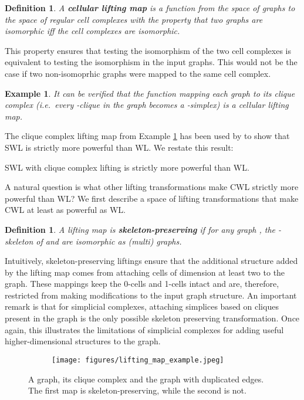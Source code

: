 \documentclass{article}
\newtheorem{definition}[theorem]{Definition}
\newtheorem{example}[theorem]{Example}
\begin{document}
\begin{definition}
A \textbf{cellular lifting map} is a function  from the space of graphs  to the space of regular cell complexes  with the property that two graphs  are isomorphic iff the cell complexes  are isomorphic.  
\end{definition}

This property ensures that testing the isomorphism of the two cell complexes is equivalent to testing the isomorphism in the input graphs. This would not be the case if two non-isomoprhic graphs were mapped to the same cell complex.

\begin{example}
\label{ex:clique_complex}
It can be verified that the function mapping each graph to its clique complex (i.e.\ every -clique in the graph becomes a -simplex) is a cellular lifting map. \end{example}

The clique complex lifting map from Example \ref{ex:clique_complex} has been used by \citet{bodnar2021weisfeiler} to show that SWL is strictly more powerful than WL. We restate this result:
\begin{theorem}
SWL with clique complex lifting is strictly more powerful than WL. 
\end{theorem}

A natural question is what other lifting transformations make CWL strictly more powerful than WL? We first describe a space of lifting transformations that make CWL at least as powerful as WL. 

\begin{definition}
A lifting map is \textbf{skeleton-preserving} if for any graph , the -skeleton of  and  are isomorphic as (multi) graphs.
\end{definition}

Intuitively, skeleton-preserving liftings ensure that the additional structure added by the lifting map comes from attaching cells of dimension at least two to the graph. These mappings keep the 0-cells and 1-cells intact and are, therefore, restricted from making modifications to the input graph structure. An important remark is that for simplicial complexes, attaching simplices based on cliques present in the graph is the only possible skeleton preserving transformation. Once again, this illustrates the limitations of simplicial complexes for adding useful higher-dimensional structures to the graph. 

\begin{wrapfigure}[9]{r}{0.35\textwidth}
    \begin{subfigure}[t!]{1.0\linewidth}
        \centering
        \vspace{-.3cm}
        \texttt{[image: figures/lifting\_map\_example.jpeg]}
        \vspace{-4mm}
    \end{subfigure}
     \caption{A graph, its clique complex and the graph with duplicated edges. The first map is skeleton-preserving, while the second is not.}
     \label{fig:sk_example}
\end{wrapfigure}
\end{document}
